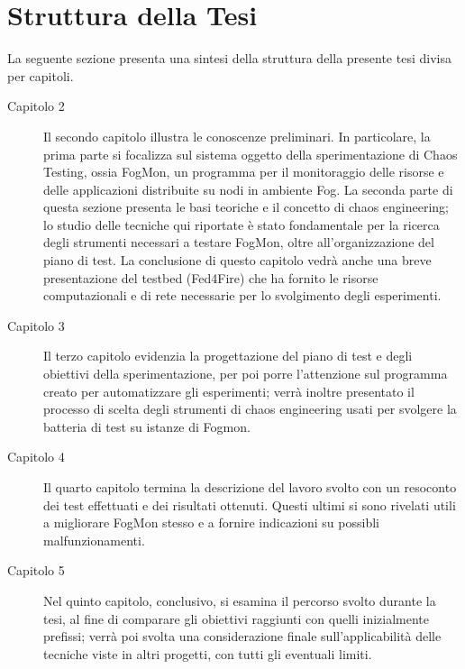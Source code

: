     \section{Struttura della Tesi}
    La seguente sezione presenta una sintesi della struttura della presente tesi divisa per capitoli.
    \begin{description}
    \item [Capitolo 2] Il secondo capitolo illustra le conoscenze preliminari. In particolare, la prima parte si focalizza sul sistema oggetto della sperimentazione di Chaos Testing, ossia FogMon, un programma per il monitoraggio delle risorse e delle applicazioni distribuite su nodi in ambiente Fog. La seconda parte di questa sezione presenta le basi teoriche e il concetto di chaos engineering; lo studio delle tecniche qui riportate è stato fondamentale per la ricerca degli strumenti necessari a testare FogMon, oltre all’organizzazione del piano di test. La conclusione di questo capitolo vedrà anche una breve presentazione del testbed (Fed4Fire) che ha fornito le risorse computazionali e di rete necessarie per lo svolgimento degli esperimenti.
    \item [Capitolo 3] Il terzo capitolo evidenzia la progettazione del piano di test e degli obiettivi della sperimentazione, per poi porre l'attenzione sul programma creato per automatizzare gli esperimenti; verrà inoltre presentato il processo di scelta degli strumenti di chaos engineering usati per svolgere la batteria di test su istanze di Fogmon.
    \item [Capitolo 4] Il quarto capitolo termina la descrizione del lavoro svolto con un resoconto dei test effettuati e dei risultati ottenuti. Questi ultimi si sono rivelati utili a migliorare FogMon stesso e a fornire indicazioni su possibli malfunzionamenti.
    \item [Capitolo 5] Nel quinto capitolo, conclusivo, si esamina il percorso svolto durante la tesi, al fine di comparare gli obiettivi raggiunti con quelli inizialmente prefissi; verrà poi svolta una considerazione finale sull’applicabilità delle tecniche viste in altri progetti, con tutti gli eventuali limiti.
    \end{description}
    